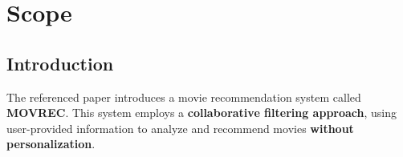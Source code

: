 \documentclass{Configuration_Files/Template}
\begin{document}


\pagestyle{empty} %
\frontmatter %


\startpreamble
\setcounter{page}{1} %


\thispagestyle{empty}
\tableofcontents %
\thispagestyle{empty}
\cleardoublepage


\mainmatter %

\chapter{Scope}

\section{Introduction}

The referenced paper introduces a movie recommendation system called \textbf{MOVREC}. This system employs a \textbf{collaborative filtering approach}, using user-provided information to analyze and recommend movies \textbf{without personalization}.
\end{document}
